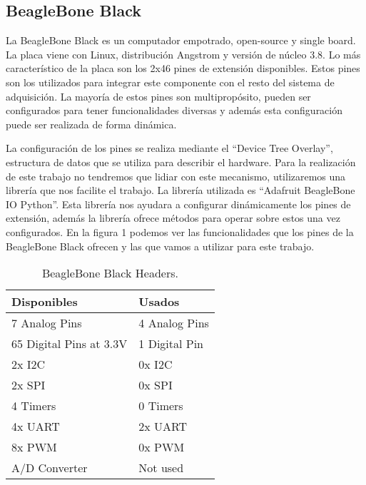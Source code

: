 	\subsection{BeagleBone Black}
		La BeagleBone Black es un computador empotrado, open-source y single board. La placa viene con Linux, distribución Angstrom y versión
		de núcleo 3.8.  Lo más característico de la placa son los 2x46 pines de extensión disponibles. Estos pines son los utilizados para
		integrar este componente con el resto del sistema de adquisición. La mayoría de estos pines son multipropósito, pueden ser
		configurados para tener funcionalidades diversas y además esta configuración puede ser realizada de forma dinámica.
		\par
		La configuración de los pines se realiza mediante el “Device Tree Overlay”, estructura de datos que se utiliza para describir el
		hardware. Para la realización de este trabajo no tendremos que lidiar con este mecanismo, utilizaremos una librería que nos facilite
		el trabajo. La librería utilizada es “Adafruit BeagleBone IO Python”. Esta librería nos ayudara a configurar dinámicamente los pines
		de extensión, además la librería ofrece métodos para operar sobre estos una vez configurados. En la figura 1 podemos ver las
		funcionalidades que los pines de la BeagleBone Black ofrecen y las que vamos a utilizar para este trabajo.
		\begin{table}[h]
	  		\begin{tabular}{|l|l|}
	    			\hline
	    			\rowcolor[HTML]{C0C0C0} 
	    			{\color[HTML]{000000} \textbf{Disponibles}} & {\color[HTML]{000000} \textbf{Usados}} \\ \hline
	    				7 Analog Pins                               & 4 Analog Pins                          \\ \hline
	    				65 Digital Pins at 3.3V                     & 1 Digital Pin                          \\ \hline
	    				2x I2C                                      & 0x I2C                                 \\ \hline
	    				2x SPI                                      & 0x SPI                                 \\ \hline
	    				4 Timers                                    & 0 Timers                               \\ \hline
	    				4x UART                                     & 2x UART                                \\ \hline
	    				8x PWM                                      & 0x PWM                                 \\ \hline
	    				A/D Converter                               & Not used                               \\ \hline
	  		\end{tabular}
			\centering
			\caption{BeagleBone Black Headers.}
			\label{fig:BBBPins}
		\end{table}
